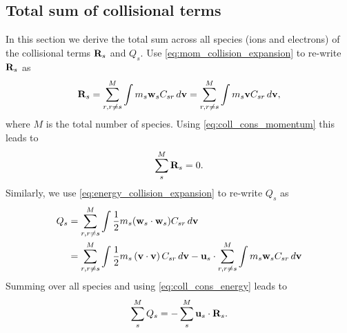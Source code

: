 \documentclass[a4paper,11pt]{report}
\begin{document}
\subsection{Total sum of collisional terms}
In this section we derive the total sum across all species (ions and electrons) of the collisional terms $\mathbf{R}_s$ and $Q_s$. Use \cref{eq:mom_collision_expansion} to re-write $\mathbf{R}_s$ as
\begin{equation*}
    \mathbf{R}_s = \sum_{r,r \ne s}^M \int m_s \mathbf{w}_s C_{s r} \, d\mathbf{v} = \sum^M_{r,r \ne s} \int m_s \mathbf{v} C_{s r} \, d\mathbf{v},
\end{equation*}
where $M$ is the total number of species. Using \cref{eq:coll_cons_momentum} this leads to
\begin{equation}
    \label{eq:sf_sum_mom_collisions}
    \sum_s^M \mathbf{R}_s = 0.
\end{equation}
Similarly, we use \cref{eq:energy_collision_expansion} to re-write $Q_s$ as
\begin{align*}
    Q_s &= \sum_{r,r \ne s}^M \int \frac{1}{2} m_s (\mathbf{w}_s \cdot \mathbf{w}_s) C_{s r} \, d\mathbf{v} \\
    &= \sum_{r,r \ne s}^M \int \frac{1}{2} m_s \left( \mathbf{v} \cdot \mathbf{v} \right) C_{sr} \, d\mathbf{v} - \mathbf{u}_s \cdot \sum_{r,r \ne s}^M \int m_s \mathbf{w}_s C_{s r} \, d\mathbf{v}
\end{align*}
Summing over all species and using \cref{eq:coll_cons_energy} leads to
\begin{equation}
    \label{eq:sf_sum_energy_collisions}
    \sum_s^M Q_s = - \sum_s^M \mathbf{u}_s \cdot \mathbf{R}_s.
\end{equation}
\end{document}
